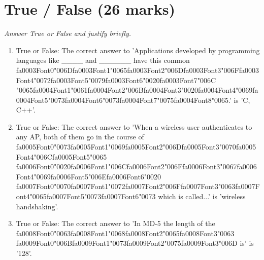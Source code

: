 \documentclass[12pt]{article}
\begin{document}
\section*{True / False (26 marks)}
\textit{Answer True or False and justify briefly.}
\begin{enumerate}[label=\arabic*.]
\item True or False: The correct answer to 'Applications developed by programming languages like \_\_\_\_ and \_\_\_\_\_\_ have this common {\csname fa0003Font0\endcsname\char"006D}{\csname fa0003Font1\endcsname\char"0065}{\csname fa0003Font2\endcsname\char"006D}{\csname fa0003Font3\endcsname\char"006F}{\csname fa0003Font4\endcsname\char"0072}{\csname fa0003Font5\endcsname\char"0079}{\csname fa0003Font6\endcsname\char"0020}{\csname fa0003Font7\endcsname\char"006C} {\char"0065}{\csname fa0004Font1\endcsname\char"0061}{\csname fa0004Font2\endcsname\char"006B}{\csname fa0004Font3\endcsname\char"0020}{\csname fa0004Font4\endcsname\char"0069}{\csname fa0004Font5\endcsname\char"0073}{\csname fa0004Font6\endcsname\char"0073}{\csname fa0004Font7\endcsname\char"0075}{\csname fa0004Font8\endcsname\char"0065}.' is 'C, C++'.
\item True or False: The correct answer to 'When a wireless user authenticates to any AP, both of them go in the course of {\csname fa0005Font0\endcsname\char"0073}{\csname fa0005Font1\endcsname\char"0069}{\csname fa0005Font2\endcsname\char"006D}{\csname fa0005Font3\endcsname\char"0070}{\csname fa0005Font4\endcsname\char"006C}{\csname fa0005Font5\endcsname\char"0065} {\csname fa0006Font0\endcsname\char"0020}{\csname fa0006Font1\endcsname\char"006C}{\csname fa0006Font2\endcsname\char"006F}{\csname fa0006Font3\endcsname\char"0067}{\csname fa0006Font4\endcsname\char"0069}{\csname fa0006Font5\endcsname\char"006E}{\csname fa0006Font6\endcsname\char"0020} {\csname fa0007Font0\endcsname\char"0070}{\csname fa0007Font1\endcsname\char"0072}{\csname fa0007Font2\endcsname\char"006F}{\csname fa0007Font3\endcsname\char"0063}{\csname fa0007Font4\endcsname\char"0065}{\csname fa0007Font5\endcsname\char"0073}{\csname fa0007Font6\endcsname\char"0073} which is called...' is 'wireless handshaking'.
\item True or False: The correct answer to 'In MD-5 the length of the {\csname fa0008Font0\endcsname\char"0063}{\csname fa0008Font1\endcsname\char"0068}{\csname fa0008Font2\endcsname\char"0065}{\csname fa0008Font3\endcsname\char"0063} {\csname fa0009Font0\endcsname\char"006B}{\csname fa0009Font1\endcsname\char"0073}{\csname fa0009Font2\endcsname\char"0075}{\csname fa0009Font3\endcsname\char"006D} is' is '128'.

\end{enumerate}
\end{document}
